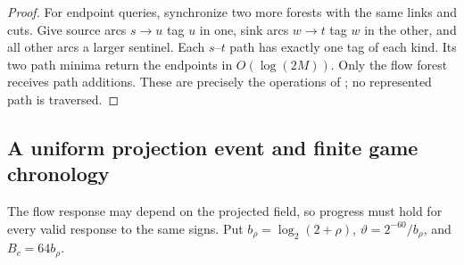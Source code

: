 \documentclass[11pt]{article}
\theoremstyle{remark}
\begin{document}
\begin{proof}
For endpoint queries, synchronize two more forests with the same links and cuts.
Give source arcs $s\to u$ tag $u$ in one, sink arcs $w\to t$ tag $w$ in the
other, and all other arcs a larger sentinel.
Each $s$--$t$ path has exactly one tag of each kind.
Its two path minima return the endpoints in $O(\log(2M))$.
Only the flow forest receives path additions.
These are precisely the operations of \cite[Section~2]{ST83:journal}; no
represented path is traversed.
\end{proof}

\subsection{A uniform projection event and finite game chronology}

The flow response may depend on the projected field, so progress must hold for
every valid response to the same signs.
Put $b_\rho= \log_2(2+\rho) $, $\vartheta=2^{-60}/b_\rho$, and
$B_c=64b_\rho$.
\end{document}
